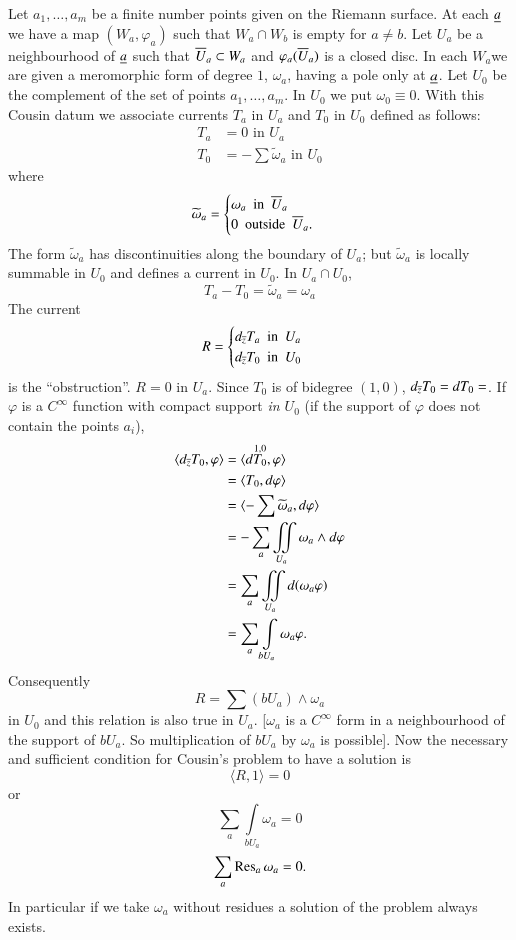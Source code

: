 Let $a_{1},\ldots,a_{m}$ be a finite number points given on the
Riemann surface. At each $\underline{a}$ we have a map $(W_{a},\varphi_{a})$
such that $W_{a}\cap W_{b}$ is empty for $a\neq b$. Let $U_{a}$ be a
neighbourhood of $\underline{a}$ such that $\overline{U}_{a}\subset W_{a}$ and
$\varphi_{a}(\overline{U}_{a})$ is a closed disc. In each
$W_{a}$\pageoriginale we are given a meromorphic form of degree $1$,
$\omega_{a}$, having a pole only at $\underline{a}$. Let $U_{0}$ be the
complement of the set of points $a_{1},\ldots,a_{m}$. In $U_{0}$ we
put $\omega_{0}\equiv 0$. With this Cousin datum we associate currents
$T_{a}$ in $U_{a}$ and $T_{0}$ in $U_{0}$ defined as follows:
\begin{align*}
T_{a} &= 0\text{ \  in \ } U_{a}\\
T_{0} &= -\sum \widetilde{\omega}_{a}\text{ \  in \ } U_{0}
\end{align*}
where
$$
\widetilde{\omega}_{a}=
\begin{cases}
\omega_{a}\text{ \  in \ } \overline{U}_{a}\\
0 \text{ \ outside \ } \overline{U}_{a}.
\end{cases}
$$
The form $\widetilde{\omega}_{a}$ has discontinuities along the
boundary of $U_{a}$; but $\widetilde{\omega}_{a}$ is locally summable
in $U_{0}$ and defines a current in $U_{0}$. In $U_{a}\cap U_{0}$,
$$
T_{a}-T_{0}=\widetilde{\omega}_{a}=\omega_{a}
$$
The current
$$
R=
\begin{cases}
d_{\overline{z}}T_{a} \text{ \ in \ } U_{a}\\
d_{\overline{z}}T_{0} \text{ \  in \ } U_{0}
\end{cases}
$$
is the ``obstruction''. $R=0$ in $U_{a}$. Since $T_{0}$ is of bidegree
$(1,0)$, $d_{\overline{z}}T_{0}=dT_{0}=$. If $\varphi$ is a $C^{\infty}$
function with compact support {\em in $U_{0}$} (\iec if the support of
$\varphi$ does not contain the points $a_{i}$),
\begin{align*}
\langle d_{\overline{z}}T_{0},\varphi\rangle &= \langle d
\overset{1,0}{T_{0}},\varphi\rangle\\
&= \langle T_{0},d\varphi\rangle\\
&= \langle -\sum\widetilde{\omega}_a, d\varphi\rangle\\
&= -\sum_{a}\iint\limits_{U_{a}}\omega_{a}\wedge d\varphi\\
&= \sum_{a}\iint\limits_{U_{a}}d(\omega_{a}\varphi)\\
&= \sum_{a}\int\limits_{bU_{a}}\omega_{a}\varphi.
\end{align*}\pageoriginale
Consequently
$$
R=\sum (bU_{a})\wedge \omega_{a}
$$
in $U_{0}$ and this relation is also true in $U_{a}$. [$\omega_{a}$ is
  a $C^{\infty}$ form in a neighbourhood of the support of
  $bU_{a}$. So multiplication of $bU_{a}$ by $\omega_{a}$ is
  possible]. Now the necessary and sufficient condition for Cousin's
problem to have a solution is
$$
\langle R,1\rangle =0
$$
or
$$
\sum_{a}\int\limits_{bU_{a}}\omega_{a}=0
$$
\iec
$$
\sum_{a}\operatorname{Res}_{a}\omega_{a}=0.
$$
In particular if we take $\omega_{a}$ without residues a solution of
the problem always exists.

